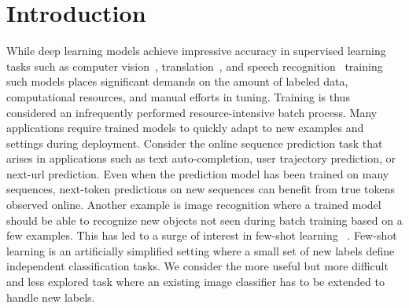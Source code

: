 \documentclass[letterpaper]{article} %
\begin{document}


\section{Introduction}

While deep learning models achieve impressive accuracy in supervised learning tasks such as computer vision~\cite{Krizhevsky_imagenetclassification},  translation~\cite{WuGNMT16}, and speech recognition~\cite{Yu14ASR} training such models places significant demands on the  amount of labeled data, computational resources, and manual efforts in tuning.  Training is thus considered an infrequently performed resource-intensive batch process.  
%
Many applications require trained models to quickly adapt to new examples and settings during deployment. Consider the online sequence prediction task that arises in applications such as text auto-completion, user trajectory prediction, or next-url prediction.  Even when the prediction model has been trained on many sequences, next-token predictions on new sequences can benefit from true tokens observed online.
Another example is image recognition where a trained model should be able to recognize new objects not seen during batch training based on a few examples. This has led to a surge of interest in  few-shot learning ~\cite{kaiser2017,SantoroBBWL16,VinyalsBLKW16,zemel17}. Few-shot learning is an artificially simplified setting where a small set of new labels define independent classification tasks. We consider the more useful but more difficult and less explored task where an existing image classifier has to be extended to handle new labels.





%
%
\end{document}
